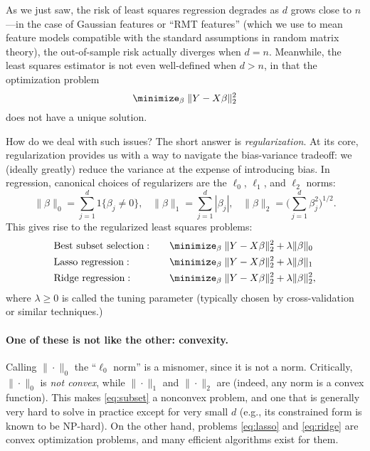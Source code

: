 \documentclass{article}
\begin{document}
As we just saw, the risk of least squares regression degrades as $d$ grows close
to $n$---in the case of Gaussian features or ``RMT features'' (which we use to
mean feature models compatible with the standard assumptions in random matrix
theory), the out-of-sample risk actually diverges when $d = n$. Meanwhile, the 
least squares estimator is not even well-defined when $d > n$, in that the
optimization problem  
\[
\minimize_\beta \; \|Y - X\beta\|_2^2 
\] 
does not have a unique solution.  

How do we deal with such issues? The short answer is \emph{regularization}. At
its core, regularization provides us with a way to navigate the bias-variance
tradeoff: we (ideally greatly) reduce the variance at the expense of introducing
bias. In regression, canonical choices of regularizers are the $\ell_0$,
$\ell_1$, and $\ell_2$ norms:    
\[
\|\beta\|_0 = \sum_{j=1}^d 1\{\beta_j \not= 0\}, \;\;\;
\|\beta\|_1 = \sum_{j=1}^d |\beta_j|, \;\;\;
\|\beta\|_2 = \bigg(\sum_{j=1}^d \beta_j^2 \bigg)^{1/2}.
\]
This gives rise to the regularized least squares problems: 
\begin{alignat}{3}
\label{eq:subset}
&\text{Best subset selection}: \quad
&&\minimize_\beta \; \|Y - X\beta\|_2^2 + \lambda \|\beta\|_0 \\ 
\label{eq:lasso}
&\text{Lasso regression}: \quad
&&\minimize_\beta \; \|Y - X\beta\|_2^2 + \lambda \|\beta\|_1 \\ 
\label{eq:ridge} 
&\text{Ridge regression}: \quad
&&\minimize_\beta \; \|Y - X\beta\|_2^2 + \lambda \|\beta\|_2^2,
\end{alignat}
where $\lambda \geq 0$ is called the tuning parameter (typically chosen by
cross-validation or similar techniques.)  

\paragraph{One of these is not like the other: convexity.}

Calling $\|\cdot\|_0$ the ``$\ell_0$ norm'' is a misnomer, since it is not a
norm. Critically, $\|\cdot\|_0$ is \emph{not convex}, while $\|\cdot\|_1$ and
$\|\cdot\|_2$ are (indeed, any norm is a convex function). This makes
\eqref{eq:subset} a nonconvex problem, and one that is generally very hard to
solve in practice except for very small $d$ (e.g., its constrained form is known
to be NP-hard). On the other hand, problems \eqref{eq:lasso} and
\eqref{eq:ridge} are convex optimization problems, and many efficient
algorithms exist for them.   
\end{document}
